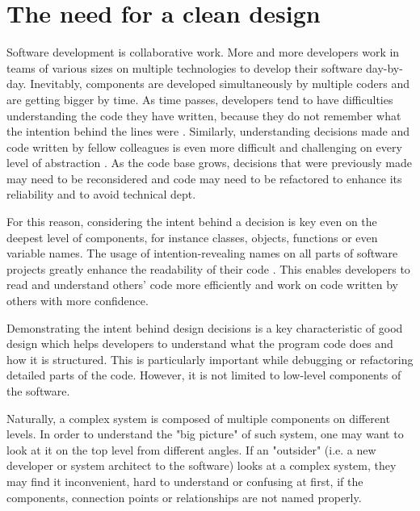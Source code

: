 \documentclass[conference]{IEEEtran}
\begin{document}
\section{The need for a clean design}
Software development is collaborative work. More and more developers work in teams of various sizes on multiple technologies to develop their software day-by-day. Inevitably, components are developed simultaneously by multiple coders and are getting bigger by time. As time passes, developers tend to have difficulties understanding the code they have written, because they do not remember what the intention behind the lines were \cite{cleancoder}. Similarly, understanding decisions made and code written by fellow colleagues is even more difficult and challenging on every level of abstraction \cite{cleancoder}. As the code base grows, decisions that were previously made may need to be reconsidered and code may need to be refactored to enhance its reliability and to avoid technical dept. 

For this reason, considering the intent behind a decision is key even on the deepest level of components, for instance classes, objects, functions or even variable names. The usage of intention-revealing names on all parts of software projects greatly enhance the readability of their code \cite{cleancode}. This enables developers to read and understand others' code more efficiently and work on code written by others with more confidence. 

Demonstrating the intent behind design decisions is a key characteristic of good design which helps developers to understand what the program code does and how it is structured. This is particularly important while debugging or refactoring detailed parts of the code. However, it is not limited to low-level components of the software. 

Naturally, a complex system is composed of multiple components on different levels. In order to understand the "big picture" of such system, one may want to look at it on the top level from different angles. If an "outsider" (i.e. a new developer or system architect to the software) looks at a complex system, they may find it inconvenient, hard to understand or confusing at first, if the components, connection points or relationships are not named properly. 
\end{document}
